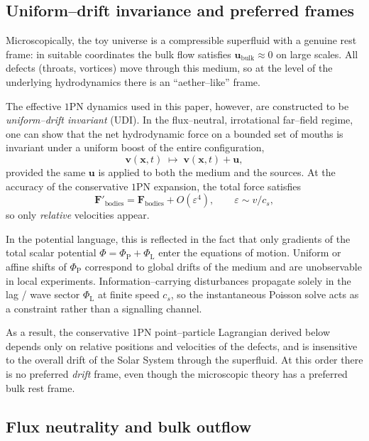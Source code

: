\documentclass[11pt]{article}
\newcommand{\cS}{c_s}
\newcommand{\PhiP}{\Phi_{\mathrm{P}}}
\newcommand{\PhiL}{\Phi_{\mathrm{L}}}
\begin{document}
\subsection{Uniform--drift invariance and preferred frames}
\label{sec:udi}

Microscopically, the toy universe is a compressible superfluid with a genuine rest frame: in suitable coordinates the bulk flow satisfies $\mathbf{u}_\mathrm{bulk} \approx 0$ on large scales. All defects (throats, vortices) move through this medium, so at the level of the underlying hydrodynamics there is an ``aether--like'' frame.

The effective $1$PN dynamics used in this paper, however, are constructed to be \emph{uniform--drift invariant} (UDI). In the flux--neutral, irrotational far--field regime, one can show that the net hydrodynamic force on a bounded set of mouths is invariant under a uniform boost of the entire configuration,
\begin{equation}
  \mathbf{v}(\mathbf{x},t) \;\mapsto\; \mathbf{v}(\mathbf{x},t) + \mathbf{u},
\end{equation}
provided the same $\mathbf{u}$ is applied to both the medium and the sources. At the accuracy of the conservative $1$PN expansion, the total force satisfies
\begin{equation}
  \mathbf{F}'_\mathrm{bodies} = \mathbf{F}_\mathrm{bodies}
  + O\!\left( \varepsilon^4 \right), \qquad
  \varepsilon \sim v/c_s ,
\end{equation}
so only \emph{relative} velocities appear.

In the potential language, this is reflected in the fact that only gradients of the total scalar potential $\Phi = \PhiP + \PhiL$ enter the equations of motion. Uniform or affine shifts of $\PhiP$ correspond to global drifts of the medium and are unobservable in local experiments. Information--carrying disturbances propagate solely in the lag / wave sector $\PhiL$ at finite speed $\cS$, so the instantaneous Poisson solve acts as a constraint rather than a signalling channel.

As a result, the conservative $1$PN point--particle Lagrangian derived below depends only on relative positions and velocities of the defects, and is insensitive to the overall drift of the Solar System through the superfluid. At this order there is no preferred \emph{drift} frame, even though the microscopic theory has a preferred bulk rest frame.

\subsection{Flux neutrality and bulk outflow}
\label{sec:flux_neutrality}
\end{document}

